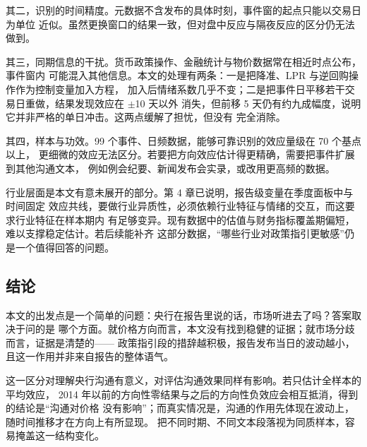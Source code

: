 其二，识别的时间精度。元数据不含发布的具体时刻，事件窗的起点只能以交易日为单位
近似。虽然更换窗口的结果一致，但对盘中反应与隔夜反应的区分仍无法做到。

其三，同期信息的干扰。货币政策操作、金融统计与物价数据常在相近时点公布，事件窗内
可能混入其他信息。本文的处理有两条：一是把降准、LPR 与逆回购操作作为控制变量加入方程，
加入后情绪系数几乎不变；二是把事件日平移若干交易日重做，结果发现效应在 $\pm$10 天以外
消失，但前移 5 天仍有约九成幅度，说明它并非严格的单日冲击。这两点缓解了担忧，但没有
完全消除。

其四，样本与功效。99 个事件、日频数据，能够可靠识别的效应量级在 70 个基点以上，
更细微的效应无法区分。若要把方向效应估计得更精确，需要把事件扩展到其他沟通文本，
例如例会纪要、新闻发布会实录，或改用更高频的数据。

行业层面是本文有意未展开的部分。第 4 章已说明，报告级变量在季度面板中与时间固定
效应共线，要做行业异质性，必须依赖行业特征与情绪的交互，而这要求行业特征在样本期内
有足够变异。现有数据中的估值与财务指标覆盖期偏短，难以支撑稳定估计。若后续能补齐
这部分数据，“哪些行业对政策指引更敏感”仍是一个值得回答的问题。

\subsection{结论}

本文的出发点是一个简单的问题：央行在报告里说的话，市场听进去了吗？答案取决于问的是
哪个方面。就价格方向而言，本文没有找到稳健的证据；就市场分歧而言，证据是清楚的——
政策指引段的措辞越积极，报告发布当日的波动越小，且这一作用并非来自报告的整体语气。

这一区分对理解央行沟通有意义，对评估沟通效果同样有影响。若只估计全样本的平均效应，
2014 年以前的方向性零结果与之后的方向性负效应会相互抵消，得到的结论是“沟通对价格
没有影响”；而真实情况是，沟通的作用先体现在波动上，随时间推移才在方向上有所显现。
把不同时期、不同文本段落视为同质样本，容易掩盖这一结构变化。
